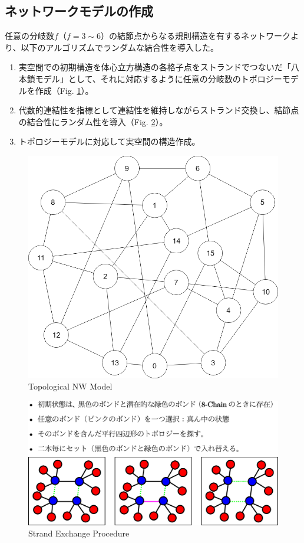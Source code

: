 \documentclass[uplatex,10pt,a4paper,twocolumn]{jsarticle}
\begin{document}
\subsection{ネットワークモデルの作成}

任意の分岐数$f$（$f=3\sim6$）の結節点からなる規則構造を有するネットワークより、以下のアルゴリズムでランダムな結合性を導入した。

\vspace{-2mm}
\begin{enumerate}
\item
実空間での初期構造を体心立方構造の各格子点をストランドでつないだ「八本鎖モデル」として、それに対応するように任意の分岐数のトポロジーモデルを作成（Fig. \ref{fig:topo}）。
\item
代数的連結性を指標として連結性を維持しながらストランド交換し、結節点の結合性にランダム性を導入（Fig. \ref{fig:exc}）。
\item
トポロジーモデルに対応して実空間の構造作成。
\end{enumerate}

\vspace{-2mm}
\begin{figure}[htb]
	\begin{center}
	\includegraphics[width=.25\textwidth]{Network.png}
	\caption{Topological NW Model}
	\label{fig:topo}
	\end{center}
\end{figure}

\vspace{-8mm}
\begin{figure}[htb]
	\begin{center}
	\includegraphics[width=.48\textwidth]{bond_exchg.png}
	\caption{Strand Exchange Procedure}
	\label{fig:exc}
	\end{center}
\end{figure}
\vspace{-5mm}
\end{document}
